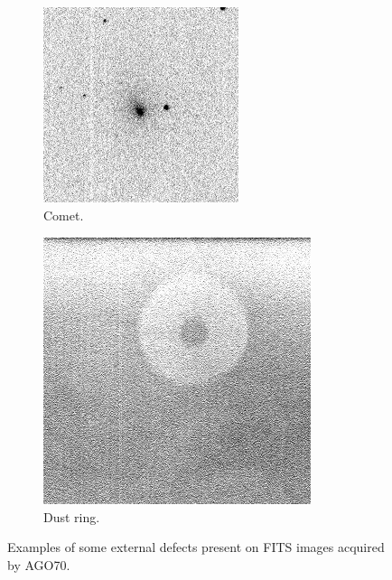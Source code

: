 \begin{figure}[!h]
        \vspace*{4mm}

        \begin{subfigure}{.3\textwidth}
            \centering
            \includegraphics[width=\textwidth]{images/comet.jpg}
            \caption{Comet.}
            \label{fig:comet}
        \end{subfigure}
        \begin{subfigure}{.3\textwidth}
            \centering
            \includegraphics[width=\textwidth]{images/dust.jpg}
            \caption{Dust ring.}
            \label{fig:dust}
        \end{subfigure}
        \caption{Examples of some external defects present on FITS images acquired by AGO70.}
        \label{fig:externaldefects}
    \end{figure}
 
